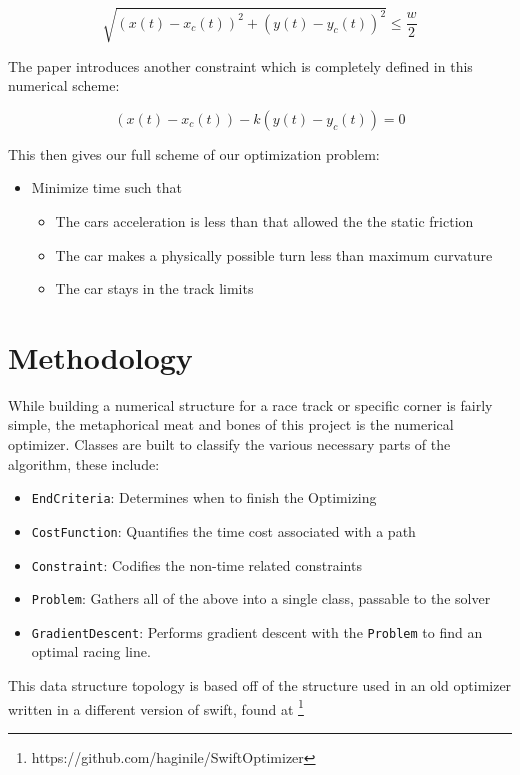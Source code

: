 \documentclass[12pt,twocolumn]{article}
\begin{document}
\begin{equation}
  \sqrt{(x(t)-x_c(t))^2+(y(t)-y_c(t))^2}\leq \frac{w}{2}
\end{equation}

The paper \cite{mit} introduces another constraint which is completely defined in this numerical scheme:

\begin{equation}
  (x(t)-x_c(t))-k(y(t)-y_c(t))=0
\end{equation}

This then gives our full scheme of our optimization problem:
\begin{itemize}
\item Minimize time such that
  \begin{itemize}
  \item The cars acceleration is less than that allowed the the static friction
  \item The car makes a physically possible turn less than maximum curvature
  \item The car stays in the track limits
  \end{itemize}
\end{itemize}
\section{Methodology}
While building a numerical structure for a race track or specific corner is fairly simple, the metaphorical meat and bones of this project is the numerical optimizer. Classes are built to classify the various necessary parts of the algorithm, these include:
\begin{itemize}
\item \verb+EndCriteria+: Determines when to finish the Optimizing
\item \verb+CostFunction+: Quantifies the time cost associated with a path
\item \verb+Constraint+: Codifies the non-time related constraints
\item \verb+Problem+: Gathers all of the above into a single class, passable to the solver
\item \verb+GradientDescent+: Performs gradient descent with the \verb+Problem+ to find an optimal racing line.
\end{itemize}
This data structure topology is based off of the structure used in an old optimizer written in a different version of swift, found at \cite{swifto}\footnote{https://github.com/haginile/SwiftOptimizer}
\end{document}
